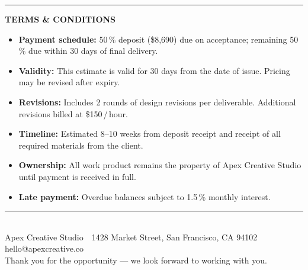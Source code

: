 \documentclass[a4paper,11pt]{article}
\newcommand{\accentrule}{\textcolor{accent}{\rule{\linewidth}{0.5pt}}}
\newcommand{\lightrule}{\textcolor{lightgray}{\rule{\linewidth}{0.4pt}}}
\begin{document}
\vspace{8mm}

\accentrule

\vspace{6mm}

{\color{accent}\bfseries\footnotesize\MakeUppercase{Terms \& Conditions}}

\vspace{3mm}

{\small\color{dark}%
\begin{itemize}[leftmargin=*, nosep, itemsep=2pt, topsep=0pt]
  \item \textbf{Payment schedule:}
    50\,\% deposit (\$8{,}690) due on acceptance;
    remaining 50\,\% due within 30 days of final delivery.
  \item \textbf{Validity:}
    This estimate is valid for 30 days from the date of issue.
    Pricing may be revised after expiry.
  \item \textbf{Revisions:}
    Includes 2 rounds of design revisions per deliverable.
    Additional revisions billed at \$150\,/\,hour.
  \item \textbf{Timeline:}
    Estimated 8--10 weeks from deposit receipt and receipt of all
    required materials from the client.
  \item \textbf{Ownership:}
    All work product remains the property of Apex Creative Studio
    until payment is received in full.
  \item \textbf{Late payment:}
    Overdue balances subject to 1.5\,\% monthly interest.
\end{itemize}
}

\vspace{\fill}

\begin{center}
\lightrule\\[5pt]
{\color{midgray}\footnotesize%
 Apex Creative Studio
 \,\textbullet\,
 1428 Market Street, San Francisco, CA 94102
 \,\textbullet\,
 hello@apexcreative.co}\\[3pt]
{\color{midgray}\footnotesize Thank you for the opportunity --- we look forward to working with you.}
\end{center}
\end{document}

